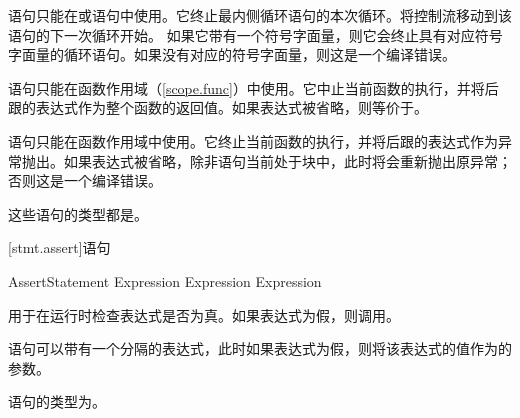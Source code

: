 \pnum
{}语句只能在或语句中使用。它终止最内侧循环语句的本次循环。将控制流移动到该语句的下一次循环开始。
如果它带有一个符号字面量，则它会终止具有对应符号字面量的循环语句。如果没有对应的符号字面量，则这是一个编译错误。

\pnum
{}语句只能在函数作用域（\ref{scope.func}）中使用。它中止当前函数的执行，并将后跟的表达式作为整个函数的返回值。如果表达式被省略，则等价于\tcode{()}。

\pnum
{}语句只能在函数作用域中使用。它终止当前函数的执行，并将后跟的表达式作为异常抛出。如果表达式被省略，除非语句当前处于块中，此时将会重新抛出原异常；否则这是一个编译错误。

\pnum
这些语句的类型都是。

[stmt.assert]{语句}

\begin{bnf}{AssertStatement}
     Expression\bnfq \br
     Expression\bnfq \terminal{:} Expression
\end{bnf}

\pnum
{}用于在运行时检查表达式是否为真。如果表达式为假，则调用。

\pnum
{}语句可以带有一个\tcode{:}分隔的表达式，此时如果表达式为假，则将该表达式的值作为的参数。

\pnum
{}语句的类型为。